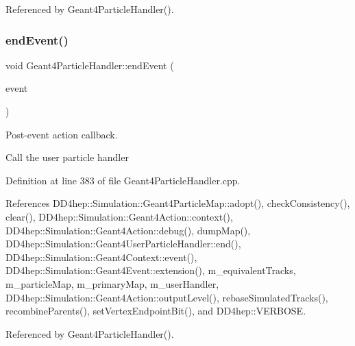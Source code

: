 Referenced by Geant4\+Particle\+Handler().

\hypertarget{class_d_d4hep_1_1_simulation_1_1_geant4_particle_handler_a6b0ac9f15f1c1280ad81ddc1faf3d417}{}\label{class_d_d4hep_1_1_simulation_1_1_geant4_particle_handler_a6b0ac9f15f1c1280ad81ddc1faf3d417} 
\subsubsection{\texorpdfstring{end\+Event()}{endEvent()}}
{\footnotesize\ttfamily void Geant4\+Particle\+Handler\+::end\+Event (\begin{DoxyParamCaption}\item[{const G4\+Event $\ast$}]{event }\end{DoxyParamCaption})\hspace{0.3cm}{\ttfamily [virtual]}}



Post-\/event action callback. 

Call the user particle handler 

Definition at line 383 of file Geant4\+Particle\+Handler.\+cpp.



References D\+D4hep\+::\+Simulation\+::\+Geant4\+Particle\+Map\+::adopt(), check\+Consistency(), clear(), D\+D4hep\+::\+Simulation\+::\+Geant4\+Action\+::context(), D\+D4hep\+::\+Simulation\+::\+Geant4\+Action\+::debug(), dump\+Map(), D\+D4hep\+::\+Simulation\+::\+Geant4\+User\+Particle\+Handler\+::end(), D\+D4hep\+::\+Simulation\+::\+Geant4\+Context\+::event(), D\+D4hep\+::\+Simulation\+::\+Geant4\+Event\+::extension(), m\+\_\+equivalent\+Tracks, m\+\_\+particle\+Map, m\+\_\+primary\+Map, m\+\_\+user\+Handler, D\+D4hep\+::\+Simulation\+::\+Geant4\+Action\+::output\+Level(), rebase\+Simulated\+Tracks(), recombine\+Parents(), set\+Vertex\+Endpoint\+Bit(), and D\+D4hep\+::\+V\+E\+R\+B\+O\+SE.



Referenced by Geant4\+Particle\+Handler().

\hypertarget{class_d_d4hep_1_1_simulation_1_1_geant4_particle_handler_a50e23a41d610fd19644a8393da13305b}{}\label{class_d_d4hep_1_1_simulation_1_1_geant4_particle_handler_a50e23a41d610fd19644a8393da13305b} 
